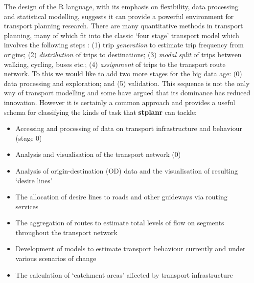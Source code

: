 The design of the R language, with its emphasis on flexibility, data
processing and statistical modelling, suggests it can provide a powerful
environment for transport planning research. There are many quantitative
methods in transport planning, many of which fit into the
classic `four stage' transport model which involves the following steps
\citep{willumsen_modelling_2011}:
(1) trip \emph{generation} to estimate trip frequency from origins;
(2) \emph{distribution} of trips to destinations;
(3) \emph{modal split} of trips between walking, cycling, buses etc.;
(4) \emph{assignment} of trips to the transport route network.
To this we would like to add two more stages for the big data age:
(0) data processing and exploration; and
(5) validation.
This sequence is not the only way of transport modelling
and some have argued that its dominance has reduced innovation.
However it is certainly a common approach and provides a useful
schema for classifying the kinds of task that \textbf{stplanr} can tackle:

\begin{itemize}
\tightlist
\item
  Accessing and processing of data on transport infrastructure and
  behaviour (stage 0)
\item
  Analysis and visualisation of the transport network (0)
\item
  Analysis of origin-destination (OD) data and the visualisation of
  resulting `desire lines'
\item
  The allocation of desire lines to roads and other guideways via
  routing services
\item
  The aggregation of routes to estimate total levels of flow on segments
  throughout the transport network
\item
  Development of models to estimate transport behaviour currently and
  under various scenarios of change
\item
  The calculation of `catchment areas' affected by transport
  infrastructure
\end{itemize}

